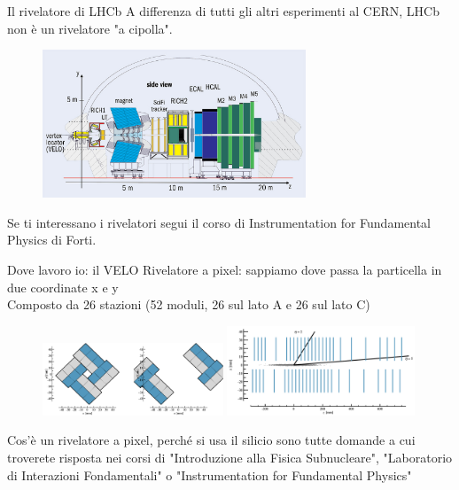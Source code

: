 \documentclass[
10pt,
aspectratio=169,
]{beamer}
\begin{document}
\begin{frame}{Il rivelatore di LHCb}
A differenza di tutti gli altri esperimenti al CERN, LHCb non è un rivelatore "a cipolla".
\begin{figure}
    \centering
    \includegraphics[width=0.7\textwidth]{detector.jpeg}
\end{figure}    
Se ti interessano i rivelatori segui il corso di Instrumentation for Fundamental Physics di Forti.
\end{frame}

\begin{frame}{Dove lavoro io: il VELO}
    Rivelatore a pixel: sappiamo dove passa la particella in due coordinate x e y\\
    Composto da 26 stazioni (52 moduli, 26 sul lato A e 26 sul lato C)
    \begin{figure}
        \centering
        \includegraphics[width=0.48\textwidth]{aperture.png}
        \includegraphics[width=0.5\textwidth]{above_view.png}
    \end{figure}
    \vfill
    Cos'è un rivelatore a pixel, perché si usa il silicio sono tutte domande a cui troverete risposta nei corsi di "Introduzione alla Fisica Subnucleare", "Laboratorio di Interazioni Fondamentali" o "Instrumentation for Fundamental Physics"
\end{frame}
\end{document}
